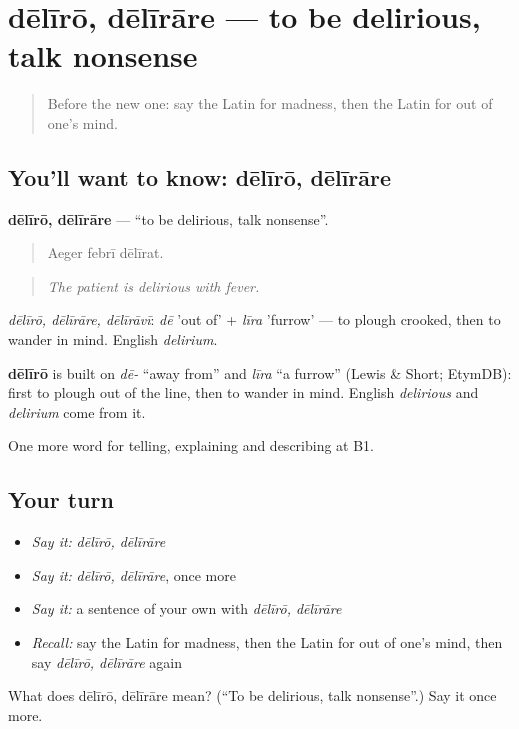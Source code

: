 \section[dēlīrō, dēlīrāre]{dēlīrō, dēlīrāre — to be delirious, talk nonsense}

\label{lesson:LA-C510-deliro}



\begin{quote}
Before the new one: say the Latin for madness, then the Latin for out of one's mind.
\end{quote}

\subsection*{You'll want to know: dēlīrō, dēlīrāre}
\textbf{dēlīrō, dēlīrāre} — \textquotedblleft{}to be delirious, talk nonsense\textquotedblright{}.

\begin{quote}
Aeger febrī dēlīrat.
\end{quote}

\begin{quote}
\emph{The patient is delirious with fever.}
\end{quote}

\emph{dēlīrō, dēlīrāre, dēlīrāvī}: \emph{dē} 'out of' + \emph{līra} 'furrow' — to plough crooked, then to wander in mind. English \emph{delirium}.

\begin{cousinweb}
\textbf{dēlīrō} is built on \emph{dē-} \textquotedblleft{}away from\textquotedblright{} and \emph{līra} \textquotedblleft{}a furrow\textquotedblright{} (Lewis \& Short; EtymDB): first to plough out of the line, then to wander in mind. English \emph{delirious} and \emph{delirium} come from it.
\end{cousinweb}

\begin{grammarlens}[title={What you've built}]
One more word for telling, explaining and describing at B1.
\end{grammarlens}

\subsection*{Your turn}
\begin{itemize}
\raggedright
  \item \emph{Say it:} \emph{dēlīrō, dēlīrāre}
  \item \emph{Say it:} \emph{dēlīrō, dēlīrāre}, once more
  \item \emph{Say it:} a sentence of your own with \emph{dēlīrō, dēlīrāre}
  \item \emph{Recall:} say the Latin for madness, then the Latin for out of one's mind, then say \emph{dēlīrō, dēlīrāre} again
\end{itemize}

\begin{tcolorbox}[breakable,colback=teal!4,colframe=teal!35!black,title={Before you move on}]
What does dēlīrō, dēlīrāre mean? (\textquotedblleft{}To be delirious, talk nonsense\textquotedblright{}.) Say it once more.
\end{tcolorbox}
